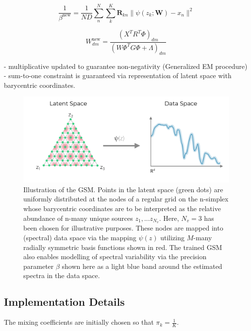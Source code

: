 \documentclass[remotesensing,article,submit,pdftex,moreauthors]{Definitions/mdpi}
\begin{document}
\begin{equation}\label{eq:beta-update}
    \frac{1}{\beta^{\text{new}}}  = \frac{1}{ND}\sum\limits_n^N\sum\limits_k^K \mathbf{R}_{kn}\lVert \psi(z_k; \mathbf{W}) - x_n \rVert^2
\end{equation}

\begin{equation}\label{eq:W-update}
    W_{dm}^\text{new} = \dfrac{\left(X^TR^T\Phi\right)_{dm}}{\left(W\Phi^TG\Phi + \Lambda\right)_{dm}} 
\end{equation}

- multiplicative updated to guarantee non-negativity (Generalized EM procedure)
- sum-to-one constraint is guaranteed via representation of latent space with barycentric coordinates.


\begin{figure}[H]
\includegraphics[width=\columnwidth]{methods/gsm/gsm-diagram.pdf}
\caption{Illustration of the GSM. Points in the latent space (green dots) are uniformly distributed at the nodes of a regular grid on the n-simplex whose barycentric coordinates are to be interpreted as the relative abundance of n-many unique sources $z_1, ... z_{N_v}$. Here, $N_v=3$ has been chosen for illustrative purposes. These nodes are mapped into (spectral) data space via the mapping $\psi(z)$ utilizing $M$-many radially symmetric basis functions shown in red. The trained GSM also enables modelling of spectral variability via the precision parameter $\beta$ shown here as a light blue band around the estimated spectra in the data space.\label{fig:gsm-diagram}}
\end{figure}  


\subsection{Implementation Details}

The mixing coefficients are initially chosen so that $\pi_k = \frac{1}{K}$.
\end{document}
